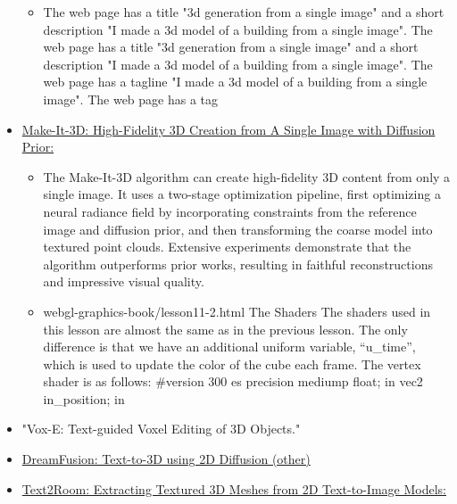 \begin{itemize}
  \begin{itemize}
  \tightlist
  \item
    The web page has a title "3d generation from a single image" and a
    short description "I made a 3d model of a building from a single
    image". The web page has a title "3d generation from a single image"
    and a short description "I made a 3d model of a building from a
    single image". The web page has a tagline "I made a 3d model of a
    building from a single image". The web page has a tag
  \end{itemize}
\item
  \href{https://make-it-3d.github.io/}{Make-It-3D: High-Fidelity 3D
  Creation from A Single Image with Diffusion Prior:}

  \begin{itemize}
  \tightlist
  \item
    The Make-It-3D algorithm can create high-fidelity 3D content from
    only a single image. It uses a two-stage optimization pipeline,
    first optimizing a neural radiance field by incorporating
    constraints from the reference image and diffusion prior, and then
    transforming the coarse model into textured point clouds. Extensive
    experiments demonstrate that the algorithm outperforms prior works,
    resulting in faithful reconstructions and impressive visual quality.
  \item
    webgl-graphics-book/lesson11-2.html The Shaders The shaders used in
    this lesson are almost the same as in the previous lesson. The only
    difference is that we have an additional uniform variable,
    ``u\_time'', which is used to update the color of the cube each
    frame. The vertex shader is as follows: \#version 300 es precision
    mediump float; in vec2 in\_position; in
  \end{itemize}
\item
  "Vox-E: Text-guided Voxel Editing of 3D Objects."
\item
  \href{https://dreamfusion3d.github.io/}{DreamFusion: Text-to-3D using
  2D Diffusion (other)}
\item
  \href{https://lukashoel.github.io/text-to-room/}{Text2Room: Extracting
  Textured 3D Meshes from 2D Text-to-Image Models:}


\end{itemize}
